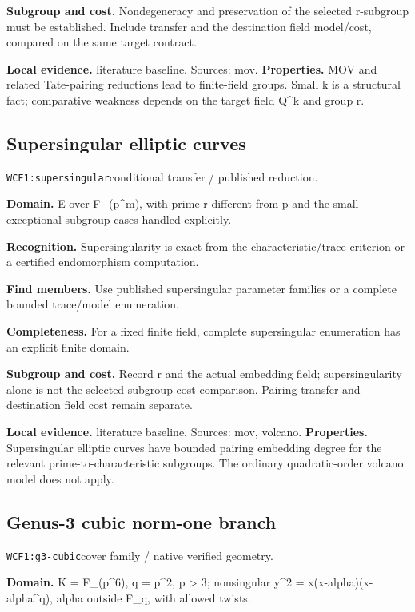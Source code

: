 \documentclass[10pt]{article}
\begin{document}
\textbf{Subgroup and cost.} Nondegeneracy and preservation of the selected r-subgroup must be established. Include transfer and the destination field model/cost, compared on the same target contract.\par
\textbf{Local evidence.} literature baseline. Sources: mov.
\textbf{Properties.} MOV and related Tate-pairing reductions lead to finite-field groups. Small k is a structural fact; comparative weakness depends on the target field Q\textasciicircum{}k and group r.\par
{}\subsection{Supersingular elliptic curves}
\texttt{WCF1:supersingular}\quad conditional transfer / published reduction.\par
\textbf{Domain.} E over F\_(p\textasciicircum{}m), with prime r different from p and the small exceptional subgroup cases handled explicitly.\par
\textbf{Recognition.} Supersingularity is exact from the characteristic/trace criterion or a certified endomorphism computation.\par
\textbf{Find members.} Use published supersingular parameter families or a complete bounded trace/model enumeration.\par
\textbf{Completeness.} For a fixed finite field, complete supersingular enumeration has an explicit finite domain.\par
\textbf{Subgroup and cost.} Record r and the actual embedding field; supersingularity alone is not the selected-subgroup cost comparison. Pairing transfer and destination field cost remain separate.\par
\textbf{Local evidence.} literature baseline. Sources: mov, volcano.
\textbf{Properties.} Supersingular elliptic curves have bounded pairing embedding degree for the relevant prime-to-characteristic subgroups. The ordinary quadratic-order volcano model does not apply.\par
{}\subsection{Genus-3 cubic norm-one branch}
\texttt{WCF1:g3-cubic}\quad cover family / native verified geometry.\par
\textbf{Domain.} K = F\_(p\textasciicircum{}6), q = p\textasciicircum{}2, p > 3; nonsingular y\textasciicircum{}2 = x(x-alpha)(x-alpha\textasciicircum{}q), alpha outside F\_q, with allowed twists.\par
\end{document}
